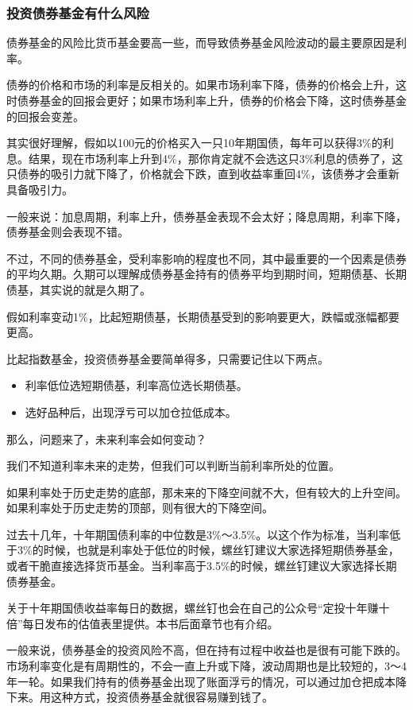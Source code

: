 \subsubsection{投资债券基金有什么风险}

债券基金的风险比货币基金要高一些，而导致债券基金风险波动的最主要原因是利率。

债券的价格和市场的利率是反相关的。如果市场利率下降，债券的价格会上升，这时债券基金的回报会更好；如果市场利率上升，债券的价格会下降，这时债券基金的回报会变差。

其实很好理解，假如以100元的价格买入一只10年期国债，每年可以获得3\%的利息。结果，现在市场利率上升到4\%，那你肯定就不会选这只3\%利息的债券了，这只债券的吸引力就下降了，价格就会下跌，直到收益率重回4\%，该债券才会重新具备吸引力。

一般来说：加息周期，利率上升，债券基金表现不会太好；降息周期，利率下降，债券基金则会表现不错。

不过，不同的债券基金，受利率影响的程度也不同，其中最重要的一个因素是债券的平均久期。久期可以理解成债券基金持有的债券平均到期时间，短期债基、长期债基，其实说的就是久期了。

假如利率变动1\%，比起短期债基，长期债基受到的影响要更大，跌幅或涨幅都要更高。

比起指数基金，投资债券基金要简单得多，只需要记住以下两点。

\begin{itemize}
\item 利率低位选短期债基，利率高位选长期债基。
\item 选好品种后，出现浮亏可以加仓拉低成本。
\end{itemize}

那么，问题来了，未来利率会如何变动？

我们不知道利率未来的走势，但我们可以判断当前利率所处的位置。

如果利率处于历史走势的底部，那未来的下降空间就不大，但有较大的上升空间。如果利率处于历史走势的顶部，则有很大的下降空间。

过去十几年，十年期国债利率的中位数是3\%～3.5\%。以这个作为标准，当利率低于3\%的时候，也就是利率处于低位的时候，螺丝钉建议大家选择短期债券基金，或者干脆直接选择货币基金。当利率高于3.5\%的时候，螺丝钉建议大家选择长期债券基金。

关于十年期国债收益率每日的数据，螺丝钉也会在自己的公众号“定投十年赚十倍”每日发布的估值表里提供。本书后面章节也有介绍。

一般来说，债券基金的投资风险不高，但在持有过程中收益也是很有可能下跌的。市场利率变化是有周期性的，不会一直上升或下降，波动周期也是比较短的，3～4年一轮。如果我们持有的债券基金出现了账面浮亏的情况，可以通过加仓把成本降下来。用这种方式，投资债券基金就很容易赚到钱了。



